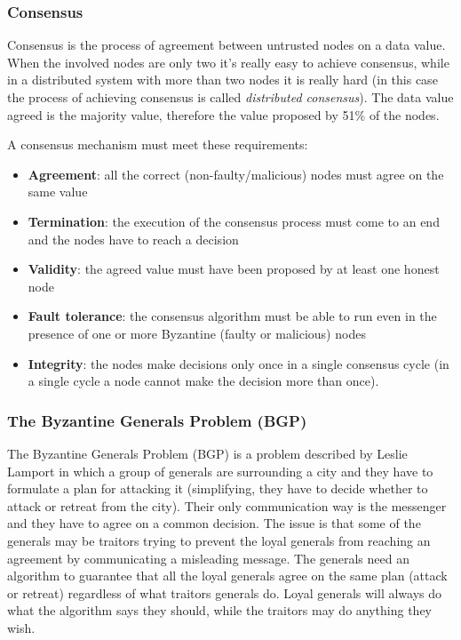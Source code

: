 \subsubsection{Consensus}
Consensus is the process of agreement between untrusted nodes on a data value.
When the involved nodes are only two it's really easy to achieve consensus, while
in a distributed system with more than two nodes it is really hard (in this case
the process of achieving consensus is called \emph{distributed consensus}).
The data value agreed is the majority value, therefore the value proposed by
51\% of the nodes.

A consensus mechanism must meet these requirements:
\begin{itemize}
  \item \textbf{Agreement}: all the correct (non-faulty/malicious) nodes must agree on the same value
  \item \textbf{Termination}: the execution of the consensus process must come
  to an end and the nodes have to reach a decision
  \item \textbf{Validity}: the agreed value must have been proposed by at least
  one honest node
  \item \textbf{Fault tolerance}: the consensus algorithm must be able to run even
  in the presence of one or more Byzantine (faulty or malicious) nodes
  \item \textbf{Integrity}: the nodes make decisions only once in a single
  consensus cycle (in a single cycle a node cannot make the decision more than once).
\end{itemize}




\subsubsection{The Byzantine Generals Problem (BGP)}
The Byzantine Generals Problem (BGP) is a problem described by Leslie Lamport
\cite{lamport1982byzantine} in which a group of generals are surrounding a city
and they have to formulate a plan for attacking it (simplifying, they have to
decide whether to attack or retreat from the city).
Their only communication way is the messenger and they have to
agree on a common decision. The issue is that some of the generals may be
traitors trying to prevent the loyal generals from reaching an agreement by
communicating a misleading message. The generals need an algorithm to guarantee
that all the loyal generals agree on the same plan (attack or retreat) regardless
of what traitors generals do. Loyal generals will always do what the algorithm says they
should, while the traitors may do anything they wish.

